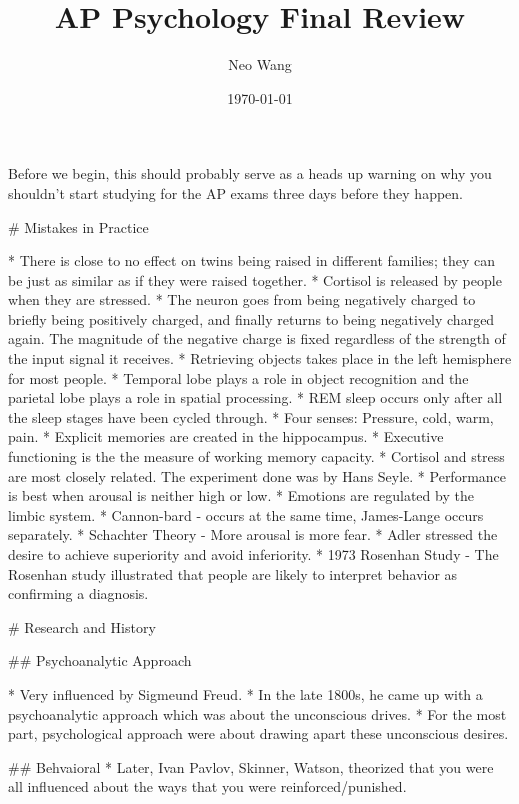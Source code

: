 \documentclass{article}
\title{AP Psychology Final Review}
\author{Neo Wang}
\date{\today}
\begin{document}
\maketitle

Before we begin, this should probably serve as a heads up warning on why you shouldn't start studying for the AP exams three days before they happen.

\tableofcontents

\begin{markdown}

# Mistakes in Practice

* There is close to no effect on twins being raised in different families; they can be just as similar as if they were raised together.
* Cortisol is released by people when they are stressed.
* The neuron goes from being negatively charged to briefly being positively charged, and finally returns to being negatively charged again. The magnitude of the negative charge is fixed regardless of the strength of the input signal it receives.
* Retrieving objects takes place in the left hemisphere for most people.
* Temporal lobe plays a role in object recognition and the parietal lobe plays a role in spatial processing.
* REM sleep occurs only after all the sleep stages have been cycled through.
* Four senses: Pressure, cold, warm, pain.
* Explicit memories are created in the hippocampus.
* Executive functioning is the the measure of working memory capacity.
* Cortisol and stress are most closely related. The experiment done was by Hans Seyle.
* Performance is best when arousal is neither high or low.
* Emotions are regulated by the limbic system.
* Cannon-bard - occurs at the same time, James-Lange occurs separately.
* Schachter Theory - More arousal is more fear.
* Adler stressed the desire to achieve superiority and avoid inferiority.
* 1973 Rosenhan Study - The Rosenhan study illustrated that people are likely to interpret behavior as confirming a diagnosis.

# Research and History

## Psychoanalytic Approach

* Very influenced by Sigmeund Freud.
* In the late 1800s, he came up with a psychoanalytic approach which was about the unconscious drives.
* For the most part, psychological approach were about drawing apart these unconscious desires.

## Behvaioral
* Later, Ivan Pavlov, Skinner, Watson, theorized that you were all influenced about the ways that you were reinforced/punished.


\end{markdown}
\end{document}

